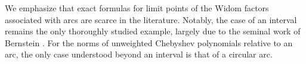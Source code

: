 \documentclass[12pt,oneside,reqno]{amsart}
\theoremstyle{definition}
\numberwithin{equation}{section}
\newcommand{\E}{{\mathsf E}}
\newcommand{\cW}{{\mathcal{W}}}
\renewcommand{\Cap}{\operatorname{Cap}}
\begin{document}
We emphasize that exact formulas for limit points of the Widom factors %
associated with arcs are scarce in the literature. Notably, the case of an interval remains the only thoroughly studied example, largely due to the seminal work of Bernstein \cite{bernstein30, bernstein31}. For the norms of unweighted Chebyshev polynomials relative to an arc, the only case understood beyond an interval is that of a circular arc.
%
\end{document}
